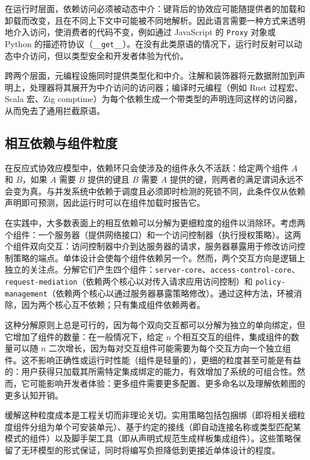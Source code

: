 在运行时层面，依赖访问必须被动态中介：键背后的协效应可能随提供者的加载和卸载而改变，且在不同上下文中可能被不同地解析。因此语言需要一种方式来透明地介入访问，使消费者的代码不变，例如通过 JavaScript 的 \texttt{Proxy} 对象\cite{ref64}或 Python 的描述符协议（\texttt{\_\_get\_\_}）\cite{ref65}。在没有此类原语的情况下，运行时反射\cite{ref66,ref67}可以动态中介访问，但以类型安全和开发者体验为代价。

跨两个层面，元编程设施同时提供类型化和中介。注解\cite{ref68}和装饰器将元数据附加到声明上，处理器将其展开为中介访问的访问器；编译时元编程（例如 Rust 过程宏、Scala 宏\cite{ref69}、Zig comptime）为每个依赖生成一个带类型的声明连同这样的访问器，从而免去了通用拦截原语。

\subsection{相互依赖与组件粒度}\label{sec:6.5}

在反应式协效应模型中，依赖环只会使涉及的组件永久不活跃：给定两个组件 $A$ 和 $B$，如果 $A$ 需要 $B$ 提供的键且 $B$ 需要 $A$ 提供的键，则两者的满足谓词永远不会变为真。与并发系统中依赖于调度且必须即时检测的死锁不同，此条件仅从依赖声明即可预测，因此运行时可以在组件加载时报告它。

在实践中，大多数表面上的相互依赖可以分解为更细粒度的组件以消除环。考虑两个组件：一个服务器（提供网络接口）和一个访问控制器（执行授权策略）。这两个组件双向交互：访问控制器中介到达服务器的请求，服务器暴露用于修改访问控制策略的端点。单体设计会使每个组件依赖另一个。然而，两个交互方向是逻辑上独立的关注点。分解它们产生四个组件：\texttt{server-core}、\texttt{access-control-core}、\texttt{request-mediation}（依赖两个核心以对传入请求应用访问控制）和 \texttt{policy-management}（依赖两个核心以通过服务器暴露策略修改）。通过这种方法，环被消除，因为两个核心互不依赖；只有集成组件依赖两者。

这种分解原则上总是可行的，因为每个双向交互都可以分解为独立的单向绑定，但它增加了组件的数量：在一般情况下，给定 $n$ 个相互交互的组件，集成组件的数量可以随 $n$ 二次增长，因为每对交互组件可能需要为每个交互方向一个独立组件。这不影响正确性或运行时性能（组件是轻量的），更细的粒度甚至可能是有益的：用户获得只加载其所需特定集成绑定的能力，有效增加了系统的可组合性。然而，它可能影响开发者体验：更多组件需要更多配置、更多命名以及理解依赖图的更多认知开销。

缓解这种粒度成本是工程关切而非理论关切。实用策略包括包捆绑（即将相关细粒度组件分组为单个可安装单元）、基于约定的接线（即自动连接名称或类型匹配某模式的组件）以及脚手架工具（即从声明式规范生成样板集成组件）。这些策略保留了无环模型的形式保证，同时将编写负担降低到更接近单体设计的程度。

